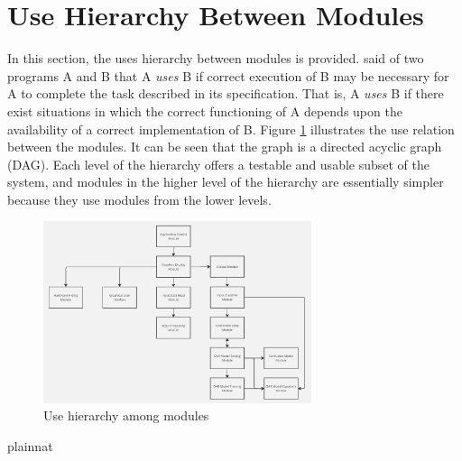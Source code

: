 \documentclass[12pt, titlepage]{article}
\begin{document}
\section{Use Hierarchy Between Modules} \label{SecUse}

In this section, the uses hierarchy between modules is
provided. \citet{Parnas1978} said of two programs A and B that A {\em uses} B if
correct execution of B may be necessary for A to complete the task described in
its specification. That is, A {\em uses} B if there exist situations in which
the correct functioning of A depends upon the availability of a correct
implementation of B.  Figure \ref{FigUH} illustrates the use relation between
the modules. It can be seen that the graph is a directed acyclic graph
(DAG). Each level of the hierarchy offers a testable and usable subset of the
system, and modules in the higher level of the hierarchy are essentially simpler
because they use modules from the lower levels.

\begin{figure}[H]
\centering
\includegraphics[width=0.7\textwidth]{OAR_UH}
\caption{Use hierarchy among modules}
\label{FigUH}
\end{figure}

 {plainnat}


\newpage{}
\end{document}
